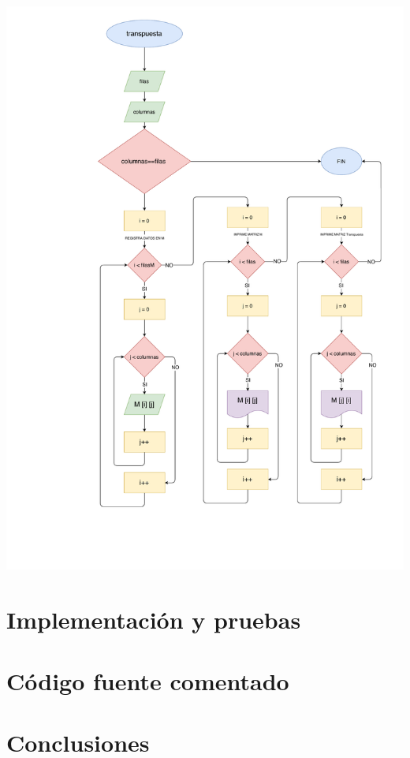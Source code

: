 \documentclass[letter]{revtex4}
\begin{document}
\begin{center}
 	\includegraphics[scale=0.6]{Images/Transpuesta.pdf}
 	\label{figura4}
 \end{center}
\clearpage

\section{Implementación y pruebas}
 

\section{Código fuente comentado}





\section{Conclusiones}
\end{document}
